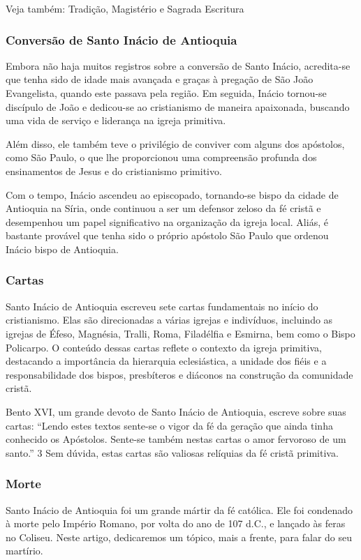 \documentclass[a4paper,14pt]{extarticle} \usepackage[utf8]{inputenc}
\begin{document}
Veja também: Tradição, Magistério e Sagrada Escritura
\subsubsection{Conversão de Santo Inácio de Antioquia}

Embora não haja muitos registros sobre a conversão de Santo Inácio, acredita-se que tenha sido de idade mais avançada e graças à pregação de São João Evangelista, quando este passava pela região. Em seguida, Inácio tornou-se discípulo de João e dedicou-se ao cristianismo de maneira apaixonada, buscando uma vida de serviço e liderança na igreja primitiva.

Além disso, ele também teve o privilégio de conviver com alguns dos apóstolos, como São Paulo, o que lhe proporcionou uma compreensão profunda dos ensinamentos de Jesus e do cristianismo primitivo.

Com o tempo, Inácio ascendeu ao episcopado, tornando-se bispo da cidade de Antioquia na Síria, onde continuou a ser um defensor zeloso da fé cristã e desempenhou um papel significativo na organização da igreja local. Aliás, é bastante provável que tenha sido o próprio apóstolo São Paulo que ordenou Inácio bispo de Antioquia.
\subsubsection{Cartas}

Santo Inácio de Antioquia escreveu sete cartas fundamentais no início do cristianismo. Elas são direcionadas a várias igrejas e indivíduos, incluindo as igrejas de Éfeso, Magnésia, Tralli, Roma, Filadélfia e Esmirna, bem como o Bispo Policarpo. O conteúdo dessas cartas reflete o contexto da igreja primitiva, destacando a importância da hierarquia eclesiástica, a unidade dos fiéis e a responsabilidade dos bispos, presbíteros e diáconos na construção da comunidade cristã.

Bento XVI, um grande devoto de Santo Inácio de Antioquia, escreve sobre suas cartas: “Lendo estes textos sente-se o vigor da fé da geração que ainda tinha conhecido os Apóstolos. Sente-se também nestas cartas o amor fervoroso de um santo.” 3 Sem dúvida, estas cartas são valiosas relíquias da fé cristã primitiva.
\subsubsection{Morte}

Santo Inácio de Antioquia foi um grande mártir da fé católica. Ele foi condenado à morte pelo Império Romano, por volta do ano de 107 d.C., e lançado às feras no Coliseu. Neste artigo, dedicaremos um tópico, mais a frente, para falar do seu martírio.
\end{document}
